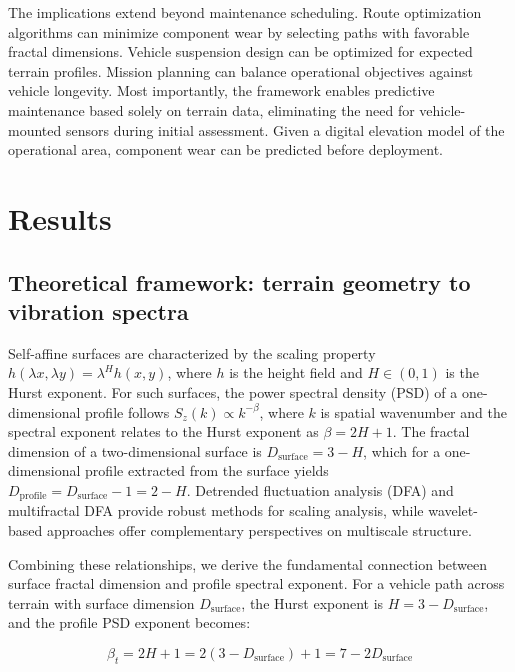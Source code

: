 \documentclass[11pt]{article}
\begin{document}
The implications extend beyond maintenance scheduling. Route optimization algorithms can minimize component wear by selecting paths with favorable fractal dimensions. Vehicle suspension design can be optimized for expected terrain profiles. Mission planning can balance operational objectives against vehicle longevity. Most importantly, the framework enables predictive maintenance based solely on terrain data, eliminating the need for vehicle-mounted sensors during initial assessment. Given a digital elevation model of the operational area, component wear can be predicted before deployment.


\section*{Results}

\subsection*{Theoretical framework: terrain geometry to vibration spectra}

Self-affine surfaces are characterized by the scaling property $h(\lambda x, \lambda y) = \lambda^H h(x,y)$, where $h$ is the height field and $H \in (0,1)$ is the Hurst exponent\cite{MandelbrotVanNess1968}. For such surfaces, the power spectral density (PSD) of a one-dimensional profile follows $S_z(k) \propto k^{-\beta}$, where $k$ is spatial wavenumber and the spectral exponent relates to the Hurst exponent as $\beta = 2H + 1$\cite{MandelbrotVanNess1968}. The fractal dimension of a two-dimensional surface is $D_{\text{surface}} = 3 - H$\cite{Mandelbrot1982,Turcotte1997}, which for a one-dimensional profile extracted from the surface yields $D_{\text{profile}} = D_{\text{surface}} - 1 = 2 - H$. Detrended fluctuation analysis (DFA)\cite{Peng1994} and multifractal DFA\cite{Kantelhardt2002} provide robust methods for scaling analysis, while wavelet-based approaches\cite{Muzy1993,Mallat2009} offer complementary perspectives on multiscale structure.

Combining these relationships, we derive the fundamental connection between surface fractal dimension and profile spectral exponent. For a vehicle path across terrain with surface dimension $D_{\text{surface}}$, the Hurst exponent is $H = 3 - D_{\text{surface}}$, and the profile PSD exponent becomes:

\begin{equation}
\beta_t = 2H + 1 = 2(3 - D_{\text{surface}}) + 1 = 7 - 2D_{\text{surface}}
\end{equation}
\end{document}
